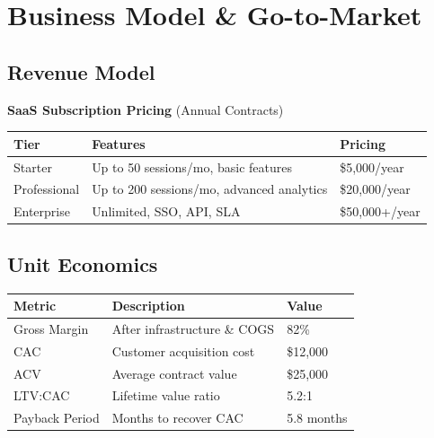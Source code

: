 \documentclass[11pt,letterpaper]{article}
\begin{document}

\section{Business Model \& Go-to-Market}

\subsection{Revenue Model}

\textbf{SaaS Subscription Pricing} (Annual Contracts)

\begin{table}[H]
\centering
\begin{tabularx}{\textwidth}{lXl}
\toprule
\textbf{Tier} & \textbf{Features} & \textbf{Pricing} \\
\midrule
Starter & Up to 50 sessions/mo, basic features & \$5,000/year \\
Professional & Up to 200 sessions/mo, advanced analytics & \$20,000/year \\
Enterprise & Unlimited, SSO, API, SLA & \$50,000+/year \\
\bottomrule
\end{tabularx}
\end{table}

\subsection{Unit Economics}

\begin{table}[H]
\centering
\begin{tabularx}{\textwidth}{lXl}
\toprule
\textbf{Metric} & \textbf{Description} & \textbf{Value} \\
\midrule
Gross Margin & After infrastructure \& COGS & 82\% \\
CAC & Customer acquisition cost & \$12,000 \\
ACV & Average contract value & \$25,000 \\
LTV:CAC & Lifetime value ratio & 5.2:1 \\
Payback Period & Months to recover CAC & 5.8 months \\
\bottomrule
\end{tabularx}
\end{table}
\end{document}
